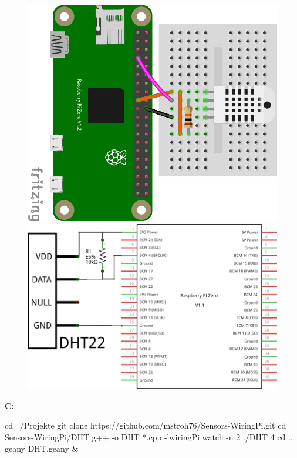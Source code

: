 
\begin{figure}[ht]
  \centering
  \includegraphics[scale=0.24]{images/DHT22_Steckplatine.png}	
  \includegraphics[scale=0.25]{images/DHT22_Schaltplan.png}	
  \label{DHT22_Steckplatine}
\end{figure}




\textbf{C:}

\begin{console}
	cd ~/Projekte
	git clone https://github.com/mstroh76/Sensors-WiringPi.git
	cd Sensors-WiringPi/DHT
	g++ -o DHT *.cpp -lwiringPi	
	watch -n 2 ./DHT 4
	cd ..
	geany DHT.geany &
\end{console}

